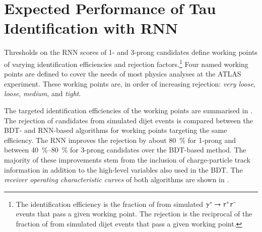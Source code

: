 \section{Expected Performance of Tau Identification with RNN}%
\label{sec:tauid_perf}

Thresholds on the RNN scores of 1- and 3-prong \tauhadvis candidates define
working points of varying \tauhadvis identification efficiencies and
\faketauhadvisC rejection factors.\footnote{The \tauhadvis identification
  efficiency is the fraction of \truetauhadvis from simulated
  $\gammastar \to \tautau$ events that pass a given working point. The
  \faketauhadvisC rejection is the reciprocal of the fraction of \faketauhadvis
  from simulated dijet events that pass a given working point.} Four named
working points are defined to cover the needs of most physics analyses at the
ATLAS experiment. These working points are, in order of increasing
\faketauhadvisC rejection: \emph{very loose}, \emph{loose}, \emph{medium}, and
\emph{tight}.

The targeted \tauhadvis identification efficiencies of the working points are
summarised in . The rejection of \faketauhadvis candidates from simulated
dijet events is compared between the BDT- and RNN-based \tauid algorithms for
working points targeting the same \truetauhadvisC efficiency. The RNN \tauid improves
the \faketauhadvisC rejection by about \SI{80}{\percent} for 1-prong and between
\SIrange[range-units=single]{40}{80}{\percent} for 3-prong \tauhadvis candidates over the BDT-based
method. The majority of these improvements stem from the inclusion of
charge-particle track information in addition to the high-level variables also
used in the BDT. The \emph{receiver operating characteristic curves} of both
algorithms are shown in .

\begin{table}[htbp]
  \centering

  \caption[Comparison of working points defined for the BDT- and RNN-based
  \tauid.]{Comparison of working points defined for the BDT- and RNN-based
    \tauid. Only the targeted \tauhadvis efficiency (target \tauhadvis eff.) of
    the working points is given, which can deviate by ca.\ \SI{1}{\percent} from
    the efficiency observed in simulated $\gammastar \to \tautau$ events. The
    \faketauhadvisC rejection is evaluated using the \tauhadvis candidate sample
    from dijet events.}%
  \label{tab:rnn_wps}

  
\end{table}

